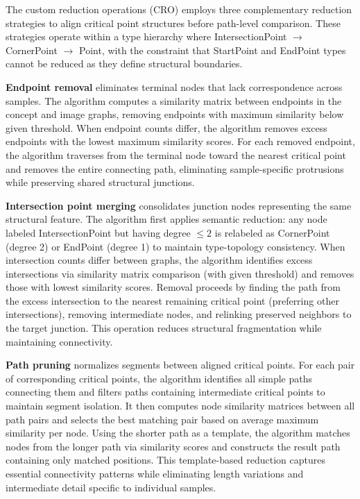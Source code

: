 \documentclass[runningheads]{llncs}
\begin{document}
The custom reduction operations (CRO) employs three complementary reduction strategies to align critical point structures before path-level comparison. These strategies operate within a type hierarchy where IntersectionPoint \(\to\) CornerPoint \(\to\) Point, with the constraint that StartPoint and EndPoint types cannot be reduced as they define structural boundaries.

\textbf{Endpoint removal} eliminates terminal nodes that lack correspondence across samples. The algorithm computes a similarity matrix between endpoints in the concept and image graphs, removing endpoints with maximum similarity below given threshold. When endpoint counts differ, the algorithm removes excess endpoints with the lowest maximum similarity scores. For each removed endpoint, the algorithm traverses from the terminal node toward the nearest critical point and removes the entire connecting path, eliminating sample-specific protrusions while preserving shared structural junctions.

\textbf{Intersection point merging} consolidates junction nodes representing the same structural feature. The algorithm first applies semantic reduction: any node labeled IntersectionPoint but having degree \(\leq 2\) is relabeled as CornerPoint (degree 2) or EndPoint (degree 1) to maintain type-topology consistency. When intersection counts differ between graphs, the algorithm identifies excess intersections via similarity matrix comparison (with given threshold) and removes those with lowest similarity scores. Removal proceeds by finding the path from the excess intersection to the nearest remaining critical point (preferring other intersections), removing intermediate nodes, and relinking preserved neighbors to the target junction. This operation reduces structural fragmentation while maintaining connectivity.

\textbf{Path pruning} normalizes segments between aligned critical points. For each pair of corresponding critical points, the algorithm identifies all simple paths connecting them and filters paths containing intermediate critical points to maintain segment isolation. It then computes node similarity matrices between all path pairs and selects the best matching pair based on average maximum similarity per node. Using the shorter path as a template, the algorithm matches nodes from the longer path via similarity scores and constructs the result path containing only matched positions. This template-based reduction captures essential connectivity patterns while eliminating length variations and intermediate detail specific to individual samples.
\end{document}
